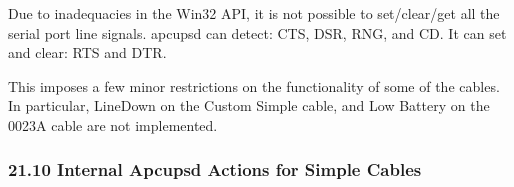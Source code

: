 \label{index-Cables-213}
\label{index-Windows-214}
Due to inadequacies in the Win32 API, it is not possible to set/clear/get all
the serial port line signals. apcupsd can detect: CTS, DSR, RNG, and CD. It
can set and clear: RTS and DTR.  

This imposes a few minor restrictions on the functionality of some of the
cables. In particular, LineDown on the Custom Simple cable, and Low Battery on
the 0023A cable are not implemented. 

\label{Internal-Apcupsd-Actions-for-Simple-Cables}

\subsubsection*{21.10 Internal Apcupsd Actions for Simple Cables}

\label{index-Cables-215}

